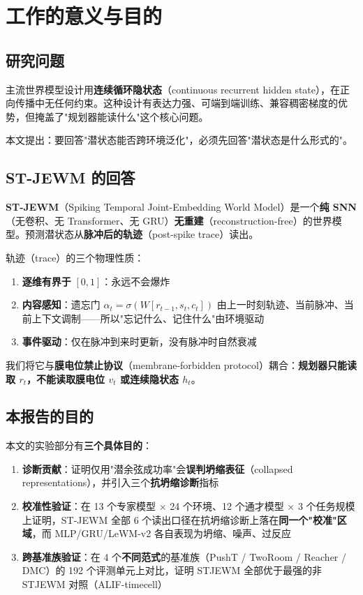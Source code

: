 \documentclass[11pt,a4paper]{article}
\begin{document}
\section{工作的意义与目的}

\subsection{研究问题}

主流世界模型设计用\textbf{连续循环隐状态}（continuous recurrent hidden state），在正向传播中无任何约束。这种设计有表达力强、可端到端训练、兼容稠密梯度的优势，但掩盖了"规划器能读什么"这个核心问题。

本文提出：要回答"潜状态能否跨环境泛化"，必须先回答"潜状态是什么形式的"。

\subsection{ST-JEWM 的回答}

\textbf{ST-JEWM}（Spiking Temporal Joint-Embedding World Model）是一个\textbf{纯 SNN}（无卷积、无 Transformer、无 GRU）\textbf{无重建}（reconstruction-free）的世界模型。预测潜状态从\textbf{脉冲后的轨迹}（post-spike trace）读出。

轨迹（trace）的三个物理性质：

\begin{enumerate}[leftmargin=2em]
    \item \textbf{逐维有界于} $[0, 1]$：永远不会爆炸
    \item \textbf{内容感知}：遗忘门 $\alpha_t = \sigma(W[r_{t-1}, s_t, c_t])$ 由上一时刻轨迹、当前脉冲、当前上下文调制——所以"忘记什么、记住什么"由环境驱动
    \item \textbf{事件驱动}：仅在脉冲到来时更新，没有脉冲时自然衰减
\end{enumerate}

我们将它与\textbf{膜电位禁止协议}（membrane-forbidden protocol）耦合：\textbf{规划器只能读取 $r_t$，不能读取膜电位 $v_t$ 或连续隐状态 $h_t$}。

\subsection{本报告的目的}

本文的实验部分有\textbf{三个具体目的}：

\begin{enumerate}[leftmargin=2em]
    \item \textbf{诊断贡献}：证明仅用"潜余弦成功率"会\textbf{误判坍缩表征}（collapsed representations），并引入三个\textbf{抗坍缩诊断}指标
    \item \textbf{校准性验证}：在 13 个专家模型 × 24 个环境、12 个通才模型 × 3 个任务规模上证明，ST-JEWM 全部 6 个读出口径在抗坍缩诊断上落在\textbf{同一个"校准"区域}，而 MLP/GRU/LeWM-v2 各自表现为坍缩、噪声、过反应
    \item \textbf{跨基准族验证}：在 4 个\textbf{不同范式}的基准族（PushT / TwoRoom / Reacher / DMC）的 192 个评测单元上对比，证明 STJEWM 全部优于最强的非 STJEWM 对照（ALIF-timecell）
\end{enumerate}
\end{document}

